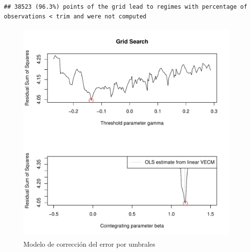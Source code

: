 \documentclass[12pt, twoside]{book}\usepackage[]{graphicx}\usepackage[]{color}
\makeatletter
\newenvironment{kframe}{%
 \def\at@end@of@kframe{}%
 \ifinner\ifhmode%
  \def\at@end@of@kframe{\end{minipage}}%
  \begin{minipage}{\columnwidth}%
 \fi\fi%
 \def\FrameCommand##1{\hskip\@totalleftmargin \hskip-\fboxsep
 \colorbox{shadecolor}{##1}\hskip-\fboxsep
     \hskip-\linewidth \hskip-\@totalleftmargin \hskip\columnwidth}%
 \MakeFramed {\advance\hsize-\width
   \@totalleftmargin\z@ \linewidth\hsize
   \@setminipage}}%
 {\par\unskip\endMakeFramed%
 \at@end@of@kframe}
\newenvironment{knitrout}{}{} %
\numberwithin{equation}{section}
\numberwithin{theorem}{section}
\numberwithin{teorema}{section}
\numberwithin{defi}{section}
\numberwithin{prop}{section}
\numberwithin{defi}{section}
\theoremstyle{plain}
\makeatother
\begin{document}
\begin{knitrout}
\color{fgcolor}\begin{kframe}
\begin{verbatim}
## 38523 (96.3%) points of the grid lead to regimes with percentage of observations < trim and were not computed
\end{verbatim}
\end{kframe}\begin{figure}[!htpb]

{\centering \includegraphics[width=4.5in,height=4.5in]{figure/fig-5_9-1} 

}

\caption[Modelo de corrección del error por umbrales]{Modelo de corrección del error por umbrales}\label{fig:fig-5.9}
\end{figure}


\end{knitrout}
\end{document}
